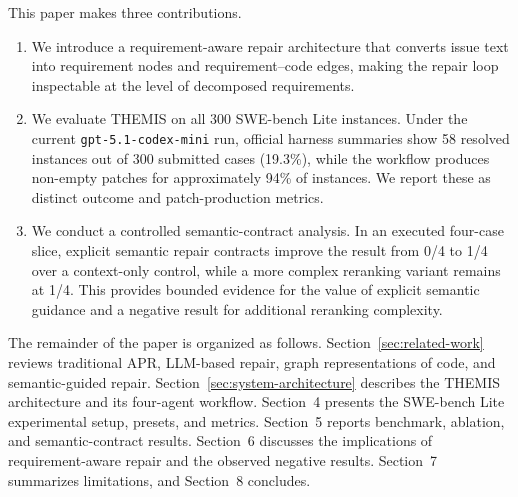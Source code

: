 \documentclass[11pt]{article}
\begin{document}
This paper makes three contributions.
\begin{enumerate}
    \item We introduce a requirement-aware repair architecture that converts issue text into requirement nodes and requirement--code edges, making the repair loop inspectable at the level of decomposed requirements.
    \item We evaluate THEMIS on all 300 SWE-bench Lite instances.  Under the current \texttt{gpt-5.1-codex-mini} run, official harness summaries show 58 resolved instances out of 300 submitted cases (19.3\%), while the workflow produces non-empty patches for approximately 94\% of instances.  We report these as distinct outcome and patch-production metrics.
    \item We conduct a controlled semantic-contract analysis.  In an executed four-case slice, explicit semantic repair contracts improve the result from 0/4 to 1/4 over a context-only control, while a more complex reranking variant remains at 1/4.  This provides bounded evidence for the value of explicit semantic guidance and a negative result for additional reranking complexity.
\end{enumerate}

The remainder of the paper is organized as follows.  Section~\ref{sec:related-work} reviews traditional APR, LLM-based repair, graph representations of code, and semantic-guided repair.  Section~\ref{sec:system-architecture} describes the THEMIS architecture and its four-agent workflow.  Section~4 presents the SWE-bench Lite experimental setup, presets, and metrics.  Section~5 reports benchmark, ablation, and semantic-contract results.  Section~6 discusses the implications of requirement-aware repair and the observed negative results.  Section~7 summarizes limitations, and Section~8 concludes.



\end{document}
